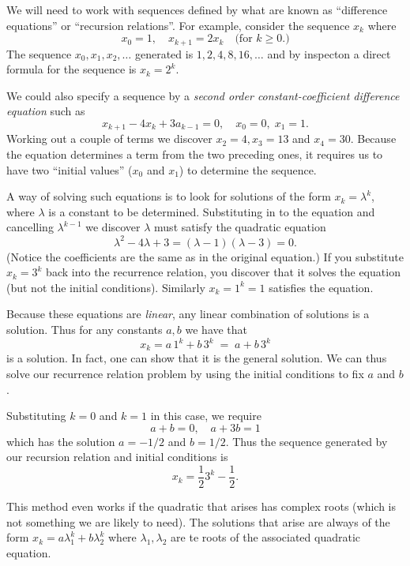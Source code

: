 

We will need to work with sequences defined by what are known as ``difference equations'' or ``recursion relations''. For example, consider the sequence $x_k$ where 
 \[
      x_0 = 1, \quad x_{k+1} = 2 x_k  \quad\text{(for $k \geq 0$.)}
 \]
The sequence $x_0, x_1, x_2, \dots$ generated is $1,2,4,8,16,\dots$ and by inspecton a direct formula for the sequence is $x_k = 2^k$. 

We could also specify a sequence by a \emph{second order constant-coefficient difference equation} such as  
 \[
      x_{k+1} - 4 x_k + 3 a_{k-1} = 0, \quad x_0 = 0, \; x_1 = 1. 
 \]
Working out a couple of terms we discover $x_2 = 4, x_3 = 13$ and $x_4=30$. Because the equation determines a term from the two preceding ones, it requires us to have two ``initial values'' ($x_0$ and $x_1$) to determine the sequence. 

A way of solving such equations is to look for solutions of the form $x_k = \lambda^k$, where $\lambda$ is a constant to be determined.  Substituting in to the equation and cancelling $\lambda^{k-1}$ we discover $\lambda$ must satisfy the quadratic equation 
 \[
     \lambda^2 - 4 \lambda + 3 = (\lambda -1)(\lambda -3) = 0. 
 \]
(Notice the coefficients are the same as in the original equation.) 
If you substitute $x_k = 3^k$ back into the recurrence relation, you discover that it solves the equation (but not the initial conditions). Similarly $ x_k = 1^k = 1$ satisfies the equation. 

Because these equations are \emph{linear}, any linear combination of solutions is a solution. Thus for any constants $a,b$ we have that 
 \[
      x_k = a \, 1^k + b \, 3^k \; = \; a + b \, 3^k 
 \]
is a solution.  In fact, one can show that it is the general solution. 
We can thus solve our recurrence relation problem by using the initial conditions to fix $a$ and $b$.  

Substituting $k=0$ and $k=1$ in this case, we require 
 \[
       a+b = 0, \quad a + 3b = 1
 \]
which has the solution $a = -1/2$ and $b= 1/2$. Thus the sequence generated by our recursion relation and initial conditions is
 \[
     x_k  = \frac12 3^k - \frac12. 
 \]

This method even works if the quadratic that arises has complex roots (which is not something we are likely to need). The solutions that arise are always of the form $x_k = a \lambda_1^k + b \lambda_2^k$ where $\lambda_1, \lambda_2$ are te roots of the associated quadratic equation. 

